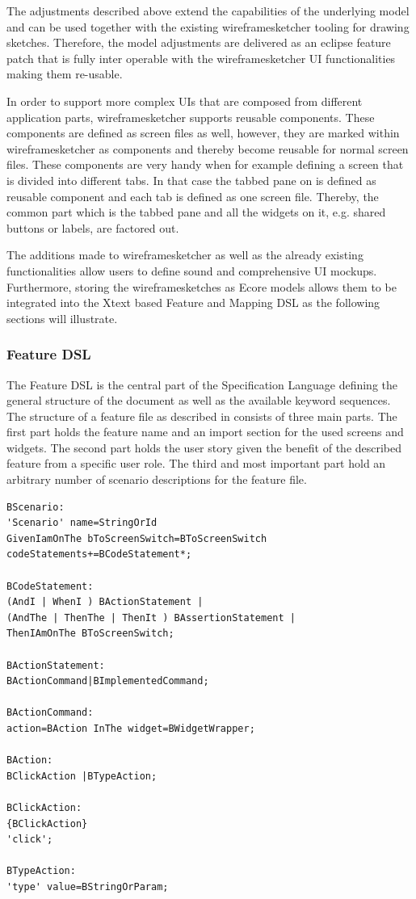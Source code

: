 \documentclass{sig-alternate-05-2015}
\begin{document}
The adjustments described above extend the capabilities of the underlying model and can be used together with the existing wireframesketcher tooling for drawing sketches.
Therefore, the model adjustments are delivered as an eclipse feature patch that is fully inter operable with the wireframesketcher UI functionalities making them re-usable.

In order to support more complex UIs that are composed from different application parts, wireframesketcher supports reusable components.
These components are defined as screen files as well, however, they are marked within wireframesketcher as components and thereby become reusable for normal screen files.
These components are very handy when for example defining a screen that is divided into different tabs.
In that case the tabbed pane on is defined as reusable component and each tab is defined as one screen file.
Thereby, the common part which is the tabbed pane and all the widgets on it, e.g. shared buttons or labels, are factored out.

The additions made to wireframesketcher as well as the already existing functionalities allow users to define sound and comprehensive UI mockups. 
Furthermore, storing the wireframesketches as Ecore models allows them to be integrated into the Xtext based Feature and Mapping DSL as the following sections will illustrate.

\subsubsection{Feature DSL}
The Feature DSL is the central part of the Specification Language defining the general structure of the document as well as the available keyword sequences.
The structure of a feature file as described in  consists of three main parts.
The first part holds the feature name and an import section for the used screens and widgets.
The second part holds the user story given the benefit of the described feature from a specific user role.
The third and most important part hold an arbitrary number of scenario descriptions for the feature file.

\begin{lstlisting}[captionpos=b, caption=Feature Grammar, label={lst:featureGrammar}, language=xtext]
BScenario:
'Scenario' name=StringOrId
GivenIamOnThe bToScreenSwitch=BToScreenSwitch 
codeStatements+=BCodeStatement*;

BCodeStatement:
(AndI | WhenI ) BActionStatement | 
(AndThe | ThenThe | ThenIt ) BAssertionStatement |   
ThenIAmOnThe BToScreenSwitch;

BActionStatement:
BActionCommand|BImplementedCommand;

BActionCommand:
action=BAction InThe widget=BWidgetWrapper;

BAction:
BClickAction |BTypeAction;

BClickAction:
{BClickAction}
'click';

BTypeAction:
'type' value=BStringOrParam;
\end{lstlisting}
\end{document}
